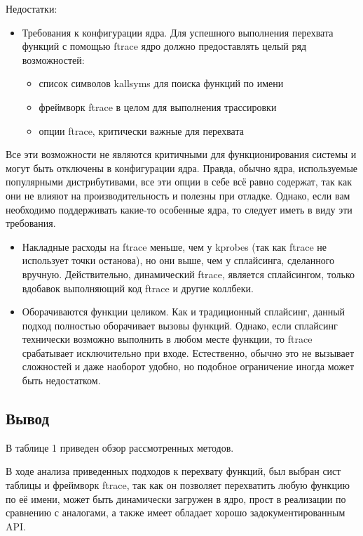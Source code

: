 Недостатки:
\begin{itemize}
	\item Требования к конфигурации ядра. Для успешного выполнения перехвата функций с помощью ftrace ядро должно предоставлять целый ряд возможностей:
	\begin{itemize}
		\item список символов kallsyms для поиска функций по имени
		\item фреймворк ftrace в целом для выполнения трассировки
		\item опции ftrace, критически важные для перехвата
	\end{itemize}
\end{itemize}

Все эти возможности не являются критичными для функционирования системы и могут быть отключены в конфигурации ядра. Правда, обычно ядра, используемые популярными дистрибутивами, все эти опции в себе всё равно содержат, так как они не влияют на производительность и полезны при отладке. Однако, если вам необходимо поддерживать какие-то особенные ядра, то следует иметь в виду эти требования.

\begin{itemize}
	\item Накладные расходы на ftrace меньше, чем у kprobes (так как ftrace не использует точки останова), но они выше, чем у сплайсинга, сделанного вручную. Действительно, динамический ftrace, является сплайсингом, только вдобавок выполняющий код ftrace и другие коллбеки.
	\item Оборачиваются функции целиком. Как и традиционный сплайсинг, данный подход полностью оборачивает вызовы функций. Однако, если сплайсинг технически возможно выполнить в любом месте функции, то ftrace срабатывает исключительно при входе. Естественно, обычно это не вызывает сложностей и даже наоборот удобно, но подобное ограничение иногда может быть недостатком.
\end{itemize}

	\subsection{Вывод}
	В таблице 1 приведен обзор рассмотренных методов.

	В ходе анализа приведенных подходов к перехвату функций,
	был выбран сист таблицы и фреймворк ftrace, так как 
	он позволяет перехватить любую функцию по её имени, 
	может быть динамически загружен в ядро, прост в реализации по сравнению с аналогами, а также имеет обладает хорошо задокументированным API. 

